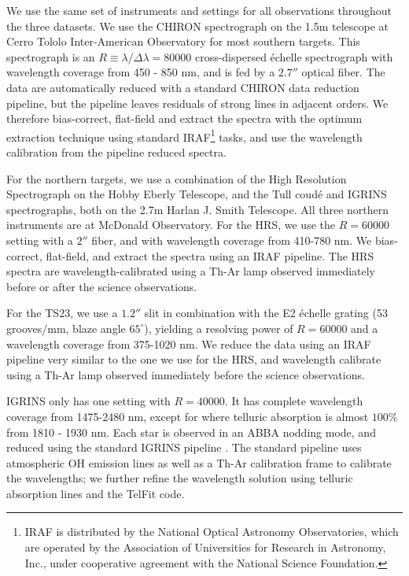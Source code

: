We use the same set of instruments and settings for all observations throughout the three datasets. We use the CHIRON spectrograph \citep{CHIRON} on the 1.5m telescope at Cerro Tololo Inter-American Observatory for most southern targets. This spectrograph is an $R\equiv \lambda / \Delta \lambda = 80000$ cross-dispersed \'echelle spectrograph with wavelength coverage from 450 - 850 nm, and is fed by a $2.7''$ optical fiber. The data are automatically reduced with a standard CHIRON data reduction pipeline, but the pipeline leaves residuals of strong lines in adjacent orders. We therefore bias-correct, flat-field and extract the spectra with the optimum extraction technique \citep{Horne1986} using standard IRAF\footnote{IRAF is distributed by the National Optical Astronomy Observatories, which are operated by the Association of Universities for Research in Astronomy, Inc., under cooperative agreement with the National Science Foundation.} tasks, and use the wavelength calibration from the pipeline reduced spectra.

For the northern targets, we use a combination of the High Resolution Spectrograph \citep[HRS,][]{HRS} on the Hobby Eberly Telescope, and the Tull coud\'e \citep[TS23,][]{TS23} and IGRINS \citep{IGRINS} spectrographs, both on the 2.7m Harlan J. Smith Telescope. All three northern instruments are at McDonald Observatory. For the HRS, we use the $R = 60000$ setting with a $2''$ fiber, and with wavelength coverage from 410-780 nm. We bias-correct, flat-field, and extract the spectra using an IRAF pipeline. The HRS spectra are wavelength-calibrated using a Th-Ar lamp observed immediately before or after the science observations.

For the TS23, we use a $1.2''$ slit in combination with the E2 \'echelle grating (53 grooves/mm, blaze angle $65^{\circ}$), yielding a resolving power of $R=60000$ and a wavelength coverage from 375-1020 nm. We reduce the data using an IRAF pipeline very similar to the one we use for the HRS, and wavelength calibrate using a Th-Ar lamp observed immediately before the science observations.

IGRINS only has one setting with $R = 40000$. It has complete wavelength coverage from 1475-2480 nm, except for where telluric absorption is almost $100\%$ from 1810 - 1930 nm. Each star is observed in an ABBA nodding mode, and reduced using the standard IGRINS pipeline \citep{IGRINS_plp_v2}. The standard pipeline uses atmospheric OH emission lines as well as a Th-Ar calibration frame to calibrate the wavelengths; we further refine the wavelength solution using telluric absorption lines and the TelFit code.


